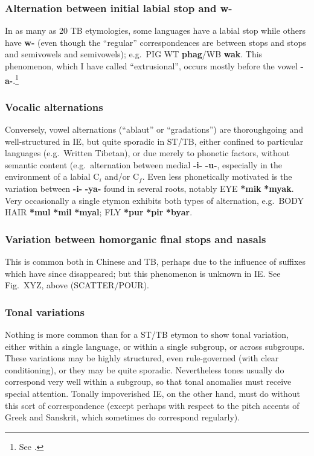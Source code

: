 \subsubsection{Alternation between initial labial stop and w-}
In as many as 20 TB etymologies, some languages have a labial stop while others have \textbf{w-} (even though the “regular” correspondences are between  stops and stops and semivowels and semivowels); e.g.\ PIG WT \textbf{phag}/WB \textbf{wak}. This phenomenon, which I have called “extrusional”, occurs mostly before the vowel \textbf{-a-}.\footnote{See \citealt{JAM2000a}.}

\subsubsection{Vocalic alternations}
Conversely, vowel alternations (“ablaut” or “gradations”) are thoroughgoing and well-structured in IE, but quite sporadic in ST/TB, either confined to particular languages (e.g.\ Written Tibetan), or due merely to phonetic factors, without semantic content (e.g.\ alternation between medial \textbf{-i-}  \textbf{-u-}, especially in the environment of a labial $\textrm{C}_i$ and/or $\textrm{C}_f$. Even less phonetically motivated is the variation between \textbf{-i-}  \textbf{-ya-} found in several roots, notably EYE \textbf{*mik}   \textbf{*myak}. Very occasionally a single etymon exhibits both types of alternation, e.g.\ BODY HAIR \textbf{*mul}  \textbf{*mil}   \textbf{*myal}; FLY \textbf{*pur}  \textbf{*pir}  \textbf{*byar}.

\subsubsection{Variation between homorganic final stops and nasals}
This is common both in Chinese and TB, perhaps due to the influence of suffixes which have since disappeared; but this phenomenon is unknown in IE. See Fig.\ XYZ, above (SCATTER/POUR).

\subsubsection{Tonal variations}
Nothing is more common than for a ST/TB etymon to show tonal variation, either within a single language, or within a single subgroup, or across subgroups. These variations may be highly structured, even rule-governed (with clear conditioning), or they may be quite sporadic. Nevertheless tones usually do correspond very well within a subgroup, so that tonal anomalies must receive special attention. Tonally impoverished IE, on the other hand, must do without this sort of correspondence (except perhaps with respect to the pitch accents of Greek and Sanskrit, which sometimes do correspond regularly).

